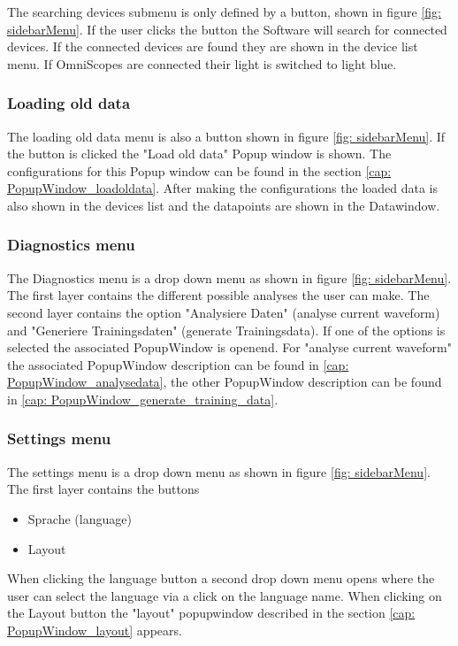 \documentclass{scrreprt}
\begin{document}
The searching devices submenu is only defined by a button, shown in figure \ref{fig: sidebarMenu}. If the user clicks the button the Software will search for connected devices. If the connected devices are found they are shown in the device list menu. 
If OmniScopes are connected their light is switched to light blue. 

\subsubsection{Loading old data}

The loading old data menu is also a button shown in figure \ref{fig: sidebarMenu}. If the button is clicked the "Load old data" Popup window is shown. 
The configurations for this Popup window can be found in the section \ref{cap: PopupWindow_loadoldata}.
After making the configurations the loaded data is also shown in the devices list and the datapoints are shown in the Datawindow.


\subsubsection{Diagnostics menu}

The Diagnostics menu is a drop down menu as shown in figure \ref{fig: sidebarMenu}. 
The first layer contains the different possible analyses the user can make. The second layer contains the option "Analysiere Daten" (analyse current waveform) and "Generiere Trainingsdaten" (generate Trainingsdata). If one of the options is selected the associated PopupWindow is openend.
For "analyse current waveform" the associated PopupWindow description can be found in \ref{cap: PopupWindow_analysedata}, the other PopupWindow description can be found in \ref{cap: PopupWindow_generate_training_data}.

\subsubsection{Settings menu}

The settings menu is a drop down menu as shown in figure \ref{fig: sidebarMenu}. 
The first layer contains the buttons
\begin{itemize}
    \item Sprache (language)
    \item Layout 
\end{itemize}

When clicking the language button a second drop down menu opens where the user can select the language via a click on the language name. 
When clicking on the Layout button the "layout" popupwindow described in the section \ref{cap: PopupWindow_layout} appears. 
\end{document}
